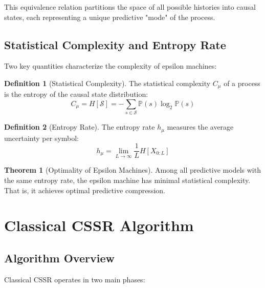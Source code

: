 \documentclass[11pt,a4paper]{report}
\newcommand{\states}{\mathcal{S}}
\newcommand{\prob}{\mathbb{P}}
\theoremstyle{definition}
\newtheorem{definition}{Definition}[chapter]
\newtheorem{theorem}{Theorem}[chapter]
\begin{document}
This equivalence relation partitions the space of all possible histories into causal states, each representing a unique predictive "mode" of the process.

\subsection{Statistical Complexity and Entropy Rate}

Two key quantities characterize the complexity of epsilon machines:

\begin{definition}[Statistical Complexity]
The statistical complexity $C_{\mu}$ of a process is the entropy of the causal state distribution:
$$C_{\mu} = H[\states] = -\sum_{s \in \states} \prob(s) \log_2 \prob(s)$$
\end{definition}

\begin{definition}[Entropy Rate]
The entropy rate $h_{\mu}$ measures the average uncertainty per symbol:
$$h_{\mu} = \lim_{L \rightarrow \infty} \frac{1}{L} H[X_{0:L}]$$
\end{definition}

\begin{theorem}[Optimality of Epsilon Machines]
\label{thm:optimality}
Among all predictive models with the same entropy rate, the epsilon machine has minimal statistical complexity. That is, it achieves optimal predictive compression.
\end{theorem}

\section{Classical CSSR Algorithm}
\label{sec:classical-cssr}

\subsection{Algorithm Overview}

Classical CSSR operates in two main phases:
\end{document}
